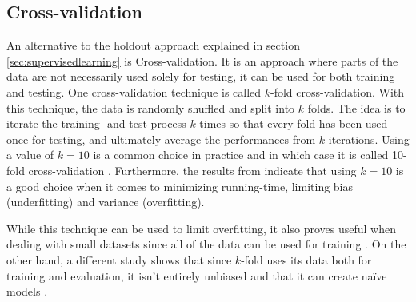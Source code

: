 	\subsection{Cross-validation} \label{sec:crossval}
	 An alternative to the holdout approach explained in section \ref{sec:supervisedlearning} is Cross-validation. It is an approach where parts of the data are not necessarily used solely for testing, it can be used for both training and testing. %
One cross-validation technique is called $k$-fold cross-validation. With this technique, the data is randomly shuffled and split into $k$ folds. The idea is to iterate the training- and test process $k$ times so that every fold has been used once for testing, and ultimately average the performances from $k$ iterations. Using a value of $k = 10$ is a common choice in practice and in which case it is called 10-fold cross-validation \cite{ARTICLE:4}. Furthermore, the results from \cite{BOOK:4} indicate that using $k=10$ is a good choice when it comes to minimizing running-time, limiting bias (underfitting) and variance (overfitting). 

	While this technique can be used to limit overfitting, it also proves useful when dealing with small datasets since all of the data can be used for training \cite{ARTICLE:4}.  On the other hand, a different study shows that since $k$-fold uses its data both for training and evaluation, it isn't entirely unbiased and that it can create naïve models \cite{ARTICLE:25}. %





